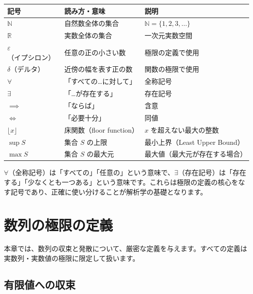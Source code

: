 \documentclass[11pt,a4paper]{jsarticle}
\theoremstyle{definition}
\newcommand{\N}{\mathbb{N}}
\newcommand{\R}{\mathbb{R}}
\newcommand{\eps}{\varepsilon}
\begin{document}
\begin{center}
\begin{tabular}{@{}lll@{}}
\toprule
\textbf{記号} & \textbf{読み方・意味} & \textbf{説明} \\
\midrule
$\N$ & 自然数全体の集合 & $\N = \{1,2,3,\ldots\}$ \\
$\R$ & 実数全体の集合 & 一次元実数空間 \\
$\eps$（イプシロン） & 任意の正の小さい数 & 極限の定義で使用 \\
$\delta$（デルタ） & 近傍の幅を表す正の数 & 関数の極限で使用 \\
$\forall$ & 「すべての…に対して」 & 全称記号 \\
$\exists$ & 「…が存在する」 & 存在記号 \\
$\implies$ & 「ならば」 & 含意 \\
$\iff$ & 「必要十分」 & 同値 \\
$\lfloor x \rfloor$ & 床関数（floor function） & $x$ を超えない最大の整数 \\
$\sup S$ & 集合 $S$ の上限 & 最小上界（Least Upper Bound） \\
$\max S$ & 集合 $S$ の最大元 & 最大値（最大元が存在する場合） \\
\bottomrule
\end{tabular}
\end{center}

\vspace{0.5cm}

\begin{notebox}
$\forall$（全称記号）は「すべての」「任意の」という意味で、$\exists$（存在記号）は「存在する」「少なくとも一つある」という意味です。これらは極限の定義の核心をなす記号であり、正確に使い分けることが解析学の基礎となります。
\end{notebox}

\newpage

\section{数列の極限の定義}\label{sec:limit-def}

本章では、数列の収束と発散について、厳密な定義を与えます。すべての定義は実数列・実数値の極限に限定して扱います。

\subsection{有限値への収束}
\end{document}
